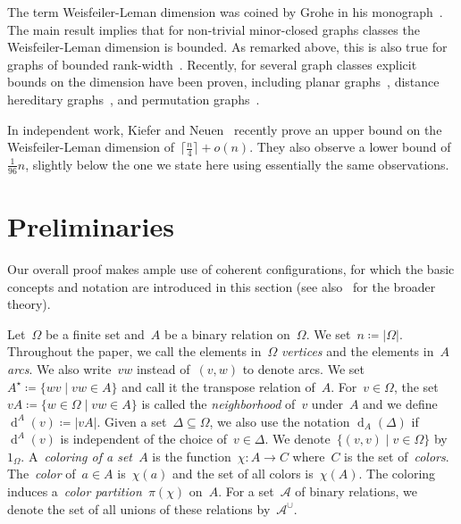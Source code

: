 \documentclass[english,a4paper]{article}
\theoremstyle{plain}
\theoremstyle{definition}
\newcommand{\abs}[1]{| #1 |}
\newcommand{\vertices}{\ensuremath{\Omega}}
\newcommand{\relations}{\ensuremath{\mathcal{A}}}
\newcommand{\coloring}{\ensuremath{\chi}}
\DeclareMathOperator{\Deg}{d}
\newcommand{\degree}[3]{\Deg_{#1}^{#3}\left(#2\right)}
\begin{document}
The term Weisfeiler-Leman dimension was coined by Grohe in his monograph~\cite{DBLP:books/cu/G2017}. The main result implies that for non-trivial minor-closed graphs classes the Weisfeiler-Leman dimension is bounded. As remarked above, this is also true for graphs of bounded rank-width~\cite{DBLP:journals/tocl/GroheN23}. Recently, for several graph classes explicit bounds on the dimension have been proven, including planar graphs~\cite{DBLP:journals/jacm/KieferPS19}, distance hereditary graphs~\cite{DBLP:journals/gc/GavrilyukNP23}, and permutation graphs~\cite{DBLP:journals/corr/abs-2305-15861}.

In independent work, Kiefer and Neuen~\cite{DBLP:journals/corr/abs-2402-03274} recently prove an upper bound on the Weisfeiler-Leman dimension of~$\lceil\frac{n}{4}\rceil+o(n)$. They also observe a lower bound of~$\frac{1}{96}n$, slightly below the one we state here using essentially the same observations.

     

\section{Preliminaries}
\label{preliminaries/sec}

Our overall proof makes ample use of coherent configurations, for which the basic concepts and notation are introduced in this section (see also~\cite{DBLP:conf/stoc/Babai16,CC} for the broader theory).

Let~$\vertices$ be a finite set and~$A$ be a binary relation on~$\vertices$.
We set~$n \coloneqq \abs{\vertices}$.
Throughout the paper, we call the elements in~$\vertices$ \emph{vertices} and the elements in~$A$ \emph{arcs}.
We also write~$vw$ instead of~$(v,w)$ to denote arcs.
We set~$A^\star \coloneqq \{wv \mid vw \in A\}$ and call it the transpose relation of~$A$.
For~$v \in \Omega$, the set~$vA \coloneqq \{w \in \vertices \mid vw \in A\}$ is called the \emph{neighborhood} of~$v$ under~$A$ and we define~$\degree{}{v}{A} \coloneqq \abs{vA}$.
Given a set~$\Delta \subseteq \vertices$, we also use the notation $\degree{A}{\Delta}{}$ if~$\degree{}{v}{A}$ is independent of the choice of~$v \in \Delta$.
We denote~$\{(v,v) \mid v \in \vertices\}$ by~$1_\vertices$.
A~\emph{coloring of a set~$A$} is the function~$\coloring \colon A \to C$ where~$C$ is the set of~\emph{colors}.
The~\emph{color} of~$a \in A$ is~$\coloring(a)$ and the set of all colors is~$\coloring(A)$.
The coloring induces a~\emph{color partition~$\pi(\coloring)$} on~$A$.
For a set~$\relations$ of binary relations, we denote the set of all unions of these relations by~$\relations^\cup$.
\end{document}
